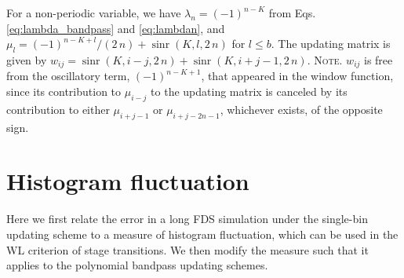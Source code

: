 \documentclass[reprint, superscriptaddress, floatfix]{revtex4-1}
\newcommand{\note}[1]{{\color{DarkGreen}\footnotesize \textsc{Note.} #1}}
\begin{document}
For a non-periodic variable,
we have $\lambda_n = (-1)^{n-K}$
from Eqs. \eqref{eq:lambda_bandpass} and \eqref{eq:lambdan},
and $\mu_l = (-1)^{n-K+l}/(2 \, n) + \operatorname{sinr}(K, l, 2 \, n)$
for $l \le b$.
%
The updating matrix is given by
$w_{ij} = \operatorname{sinr}(K, i-j, 2 \, n) + \operatorname{sinr}(K, i+j-1, 2 \, n)$.
%
\note{$w_{ij}$
  is free from the oscillatory term, $(-1)^{n-K+1}$,
  that appeared in the window function, since
  its contribution to $\mu_{i-j}$ to the updating matrix
  is canceled by its contribution to either $\mu_{i+j-1}$
  or $\mu_{i+j-2n-1}$,
  whichever exists, of the opposite sign.}
%



\section{\label{sec:hfluc}
Histogram fluctuation}


Here we first relate the error
in a long FDS simulation under the single-bin updating scheme
to a measure of histogram fluctuation,
which can be used in the WL criterion of stage transitions.
%
We then modify the measure
such that it applies to
the polynomial bandpass updating schemes.

\end{document}
